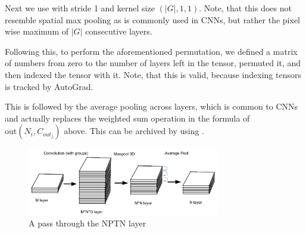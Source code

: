 \documentclass{llncs}
\begin{document}
Next we use \nnMaxPool with stride 1 and kernel size $(|G|,1,1)$. Note, that this does not resemble spatial max pooling as is commonly used in CNNs, but rather the pixel wise maximum of $|G|$ consecutive layers.

Following this, to perform the aforementioned permutation, we defined a matrix of numbers from zero to the number of layers left in the tensor, permuted it, and then indexed the tensor with it. Note, that this is valid, because indexing tensors is tracked by AutoGrad.

This is followed by the average pooling across layers, which is common to CNNs and actually replaces the weighted sum operation in the formula of $\text{out}(N_i, C_{out_j})$ above. This can be archived by using \nnAvgPool.

\begin{figure}
	\begin{center}
		\includegraphics[width=0.75\textwidth]{result_images/NptnImplementation.png}
		\caption{A pass through the NPTN layer}
		\label{fig:NptnImplementation}
	\end{center}
\end{figure}
\end{document}
